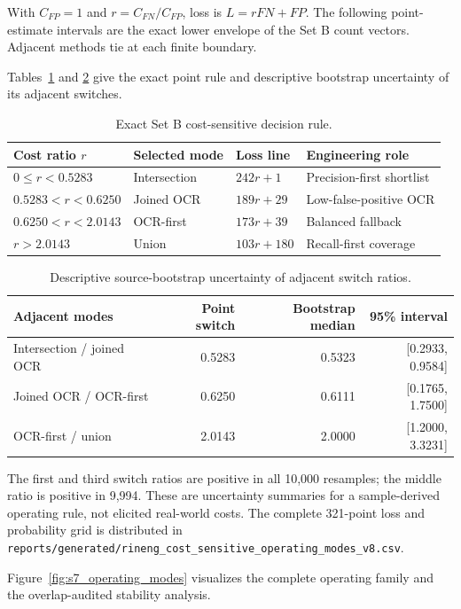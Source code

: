 \documentclass[11pt]{article}
\begin{document}
With $C_{FP}=1$ and $r=C_{FN}/C_{FP}$, loss is $L=rFN+FP$. The following
point-estimate intervals are the exact lower envelope of the Set B count
vectors. Adjacent methods tie at each finite boundary.

Tables~\ref{tab:s7_cost_rule} and \ref{tab:s7_cost_switches} give the exact
point rule and descriptive bootstrap uncertainty of its adjacent switches.

\begin{table}[H]
\centering
\caption{Exact Set B cost-sensitive decision rule.}
\label{tab:s7_cost_rule}
\small
\begin{tabular}{llll}
\toprule
Cost ratio $r$ & Selected mode & Loss line & Engineering role \\
\midrule
$0\leq r<0.5283$ & Intersection & $242r+1$ & Precision-first shortlist \\
$0.5283<r<0.6250$ & Joined OCR & $189r+29$ & Low-false-positive OCR \\
$0.6250<r<2.0143$ & OCR-first & $173r+39$ & Balanced fallback \\
$r>2.0143$ & Union & $103r+180$ & Recall-first coverage \\
\bottomrule
\end{tabular}
\end{table}

\begin{table}[H]
\centering
\caption{Descriptive source-bootstrap uncertainty of adjacent switch ratios.}
\label{tab:s7_cost_switches}
\small
\begin{tabular}{lrrr}
\toprule
Adjacent modes & Point switch & Bootstrap median & 95\% interval \\
\midrule
Intersection / joined OCR & 0.5283 & 0.5323 & [0.2933, 0.9584] \\
Joined OCR / OCR-first & 0.6250 & 0.6111 & [0.1765, 1.7500] \\
OCR-first / union & 2.0143 & 2.0000 & [1.2000, 3.3231] \\
\bottomrule
\end{tabular}
\end{table}

The first and third switch ratios are positive in all 10,000 resamples; the
middle ratio is positive in 9,994. These are uncertainty summaries for a
sample-derived operating rule, not elicited real-world costs. The complete
321-point loss and probability grid is distributed in
\texttt{reports/generated/rineng\_cost\_sensitive\_operating\_modes\_v8.csv}.

Figure~\ref{fig:s7_operating_modes} visualizes the complete operating family
and the overlap-audited stability analysis.
\end{document}
